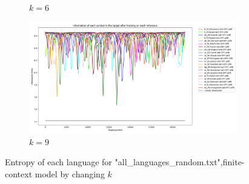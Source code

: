 \documentclass{article}
\begin{document}
\begin{figure}
\begin{subfigure}[b]{0.3\textwidth}
        \caption{$k = 6$}
        \label{fig:all_languages_random_p_c:1:6}
    \end{subfigure}
    \hfill
    \begin{subfigure}[b]{0.3\textwidth}
        \begin{center}
            \includegraphics[width=1.0\linewidth]{../results/all_languages_random/-p_c:1:9.png}
        \end{center}
        \caption{$k = 9$}
        \label{fig:all_languages_random_p_c:1:9}
    \end{subfigure}
    
    \caption{Entropy of each language for "all_languages_random.txt",finite-context model by changing $k$}
    \label{fig:all_languages_random_p_c:k}
\end{figure}
\end{document}
